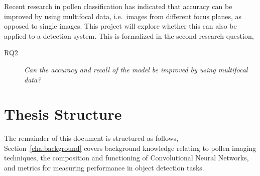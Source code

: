 Recent research in pollen classification has indicated that accuracy can be improved by using multifocal data, i.e.\ images from different focus planes, as opposed to single images.
This project will explore whether this can also be applied to a detection system.
This is formalized in the second research question,

\begin{description}
    \item[RQ2] \textit{Can the accuracy and recall of the model be improved by using multifocal data?}
\end{description}

\section{Thesis Structure}\label{sec:intro-thesis-structure}
The remainder of this document is structured as follows,
Section~\ref{cha:background} covers background knowledge relating to pollen imaging techniques, the composition and functioning of Convolutional Neural Networks, and metrics for measuring performance in object detection tasks.